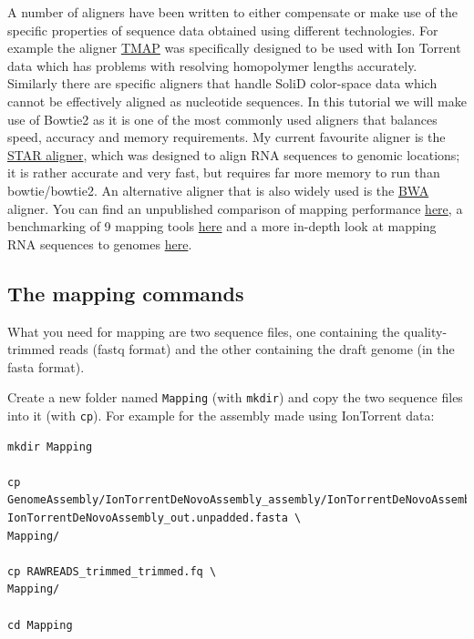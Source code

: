 \documentclass[11pt]{article}
\begin{document}
A number of aligners have been written to either compensate or make use of
the specific properties of sequence data obtained using different
technologies. For example the aligner \href{https://www.google.no/url?sa=t&rct=j&q=&esrc=s&source=web&cd=5&ved=0CD4QFjAE&url=https\%3A\%2F\%2Fgithub.com\%2Fiontorrent\%2FTMAP&ei=1u07VZCXFYGqywPBz4DoDg&usg=AFQjCNE3vZXuQ1ygljhBcrozKj_nBU84TQ&sig2=u5_YVYBE904ay-9oLUuMOQ&bvm=bv.91665533,d.bGQ}{TMAP} was specifically
designed to be used with Ion Torrent data which has problems with resolving
homopolymer lengths accurately. Similarly there are specific aligners that
handle SoliD color-space data which cannot be effectively aligned as
nucleotide sequences. In this tutorial we will make use of Bowtie2 as it is
one of the most commonly used aligners that balances speed, accuracy and
memory requirements. My current favourite aligner is the \href{http://bioinformatics.oxfordjournals.org/content/early/2012/10/25/bioinformatics.bts635}{STAR aligner}, which
was designed to align RNA sequences to genomic locations; it is rather
accurate and very fast, but requires far more memory to run than bowtie/bowtie2.
An alternative aligner that is also widely used is the \href{http://bio-bwa.sourceforge.net/}{BWA} aligner. You can
find an unpublished comparison of mapping performance \href{http://genomespot.blogspot.no/2014/11/dna-aligner-accuracy-bwa-bowtie-soap.html}{here}, a benchmarking of
9 mapping tools \href{http://bmcbioinformatics.biomedcentral.com/articles/10.1186/1471-2105-14-184}{here} and a more in-depth look at mapping RNA sequences to genomes \href{http://www.nature.com/nmeth/journal/v10/n12/full/nmeth.2722.html}{here}.

\subsection{The mapping commands}
\label{sec-1-1}

What you need for mapping are two sequence files, one containing the
quality-trimmed reads (fastq format) and the other containing the draft genome
(in the fasta format).

Create a new folder named \texttt{Mapping} (with \texttt{mkdir}) and copy the two
sequence files into it (with \texttt{cp}). For example for the assembly made using
IonTorrent data:

\begin{verbatim}
mkdir Mapping

cp GenomeAssembly/IonTorrentDeNovoAssembly_assembly/IonTorrentDeNovoAssembly_d_results/\
IonTorrentDeNovoAssembly_out.unpadded.fasta \
Mapping/

cp RAWREADS_trimmed_trimmed.fq \
Mapping/

cd Mapping
\end{verbatim}
\end{document}
